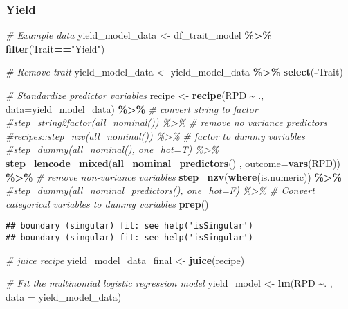 \documentclass[
]{article}
\newenvironment{Shaded}{\begin{snugshade}}{\end{snugshade}}
\newcommand{\AttributeTok}[1]{\textcolor[rgb]{0.13,0.29,0.53}{#1}}
\newcommand{\CommentTok}[1]{\textcolor[rgb]{0.56,0.35,0.01}{\textit{#1}}}
\newcommand{\FunctionTok}[1]{\textcolor[rgb]{0.13,0.29,0.53}{\textbf{#1}}}
\newcommand{\NormalTok}[1]{#1}
\newcommand{\OtherTok}[1]{\textcolor[rgb]{0.56,0.35,0.01}{#1}}
\newcommand{\SpecialCharTok}[1]{\textcolor[rgb]{0.81,0.36,0.00}{\textbf{#1}}}
\newcommand{\StringTok}[1]{\textcolor[rgb]{0.31,0.60,0.02}{#1}}
\begin{document}
\hypertarget{yield}{%
\subsubsection{Yield}\label{yield}}

\begin{Shaded}
\begin{Highlighting}[]
\CommentTok{\# Example data}
\NormalTok{yield\_model\_data }\OtherTok{\textless{}{-}}\NormalTok{ df\_trait\_model }\SpecialCharTok{\%\textgreater{}\%} \FunctionTok{filter}\NormalTok{(Trait}\SpecialCharTok{==}\StringTok{"Yield"}\NormalTok{)}

\CommentTok{\# Remove trait}
\NormalTok{yield\_model\_data }\OtherTok{\textless{}{-}}\NormalTok{ yield\_model\_data }\SpecialCharTok{\%\textgreater{}\%} \FunctionTok{select}\NormalTok{(}\SpecialCharTok{{-}}\NormalTok{Trait)}

\CommentTok{\# Standardize predictor variables}
\NormalTok{recipe }\OtherTok{\textless{}{-}} \FunctionTok{recipe}\NormalTok{(RPD }\SpecialCharTok{\textasciitilde{}}\NormalTok{ ., }\AttributeTok{data=}\NormalTok{yield\_model\_data) }\SpecialCharTok{\%\textgreater{}\%}
    \CommentTok{\# convert string to factor}
    \CommentTok{\#step\_string2factor(all\_nominal()) \%\textgreater{}\%}
    \CommentTok{\# remove no variance predictors }
    \CommentTok{\#recipes::step\_nzv(all\_nominal()) \%\textgreater{}\%}
    \CommentTok{\# factor to  dummy variables}
    \CommentTok{\#step\_dummy(all\_nominal(), one\_hot=T) \%\textgreater{}\%}
    \FunctionTok{step\_lencode\_mixed}\NormalTok{(}\FunctionTok{all\_nominal\_predictors}\NormalTok{() , }\AttributeTok{outcome=}\FunctionTok{vars}\NormalTok{(RPD)) }\SpecialCharTok{\%\textgreater{}\%}
    \CommentTok{\# remove non{-}variance variables}
    \FunctionTok{step\_nzv}\NormalTok{(}\FunctionTok{where}\NormalTok{(is.numeric)) }\SpecialCharTok{\%\textgreater{}\%}
    \CommentTok{\#step\_dummy(all\_nominal\_predictors(), one\_hot=F) \%\textgreater{}\%  \# Convert categorical   variables to dummy variables}
    \FunctionTok{prep}\NormalTok{()}
\end{Highlighting}
\end{Shaded}

\begin{verbatim}
## boundary (singular) fit: see help('isSingular')
## boundary (singular) fit: see help('isSingular')
\end{verbatim}

\begin{Shaded}
\begin{Highlighting}[]
\CommentTok{\# juice recipe}
\NormalTok{yield\_model\_data\_final }\OtherTok{\textless{}{-}} \FunctionTok{juice}\NormalTok{(recipe)}

\CommentTok{\# Fit the multinomial logistic regression model}
\NormalTok{yield\_model }\OtherTok{\textless{}{-}} \FunctionTok{lm}\NormalTok{(RPD }\SpecialCharTok{\textasciitilde{}}\NormalTok{. , }\AttributeTok{data =}\NormalTok{ yield\_model\_data)}
\end{Highlighting}
\end{Shaded}
\end{document}
